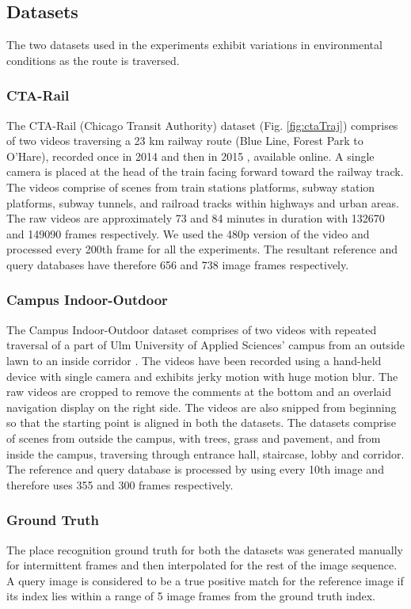 \documentclass[letterpaper, 10 pt, conference]{ieeeconf}  %
\begin{document}
\subsection{Datasets}
The two datasets used in the experiments exhibit variations in environmental conditions as the route is traversed.

\subsubsection{CTA-Rail}
The CTA-Rail (Chicago Transit Authority) dataset (Fig. \ref{fig:ctaTraj}) comprises of two videos traversing a 23 km railway route (Blue Line, Forest Park to O'Hare), recorded once in 2014 \cite{ctaRail2014} and then in 2015 \cite{ctaRail2015}, available online. A single camera is placed at the head of the train facing forward toward the railway track. The videos comprise of scenes from train stations platforms, subway station platforms, subway tunnels, and railroad tracks within highways and urban areas. The raw videos are approximately 73 and 84 minutes in duration with 132670 and 149090 frames respectively. We used the 480p version of the video and processed every 200th frame for all the experiments. The resultant reference and query databases have therefore 656 and 738 image frames respectively.

\subsubsection{Campus Indoor-Outdoor}
The Campus Indoor-Outdoor dataset comprises of two videos with repeated traversal of a part of Ulm University of Applied Sciences' campus from an outside lawn to an inside corridor \cite{indoorOutdoor1,indoorOutdoor2}. The videos have been recorded using a hand-held device with single camera and exhibits jerky motion with huge motion blur. The raw videos are cropped to remove the comments at the bottom and an overlaid navigation display on the right side. The videos are also snipped from beginning so that the starting point is aligned in both the datasets. The datasets comprise of scenes from outside the campus, with trees, grass and pavement, and from inside the campus, traversing through entrance hall, staircase, lobby and corridor. The reference and query database is processed by using every 10th image and therefore uses 355 and 300 frames respectively.

\subsubsection{Ground Truth}
The place recognition ground truth for both the datasets was generated manually for intermittent frames and then interpolated for the rest of the image sequence. A query image is considered to be a true positive match for the reference image if its index lies within a range of 5 image frames from the ground truth index.
\end{document}
